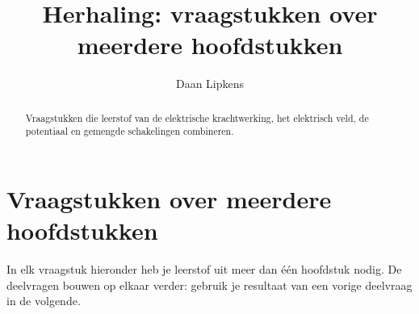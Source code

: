 \documentclass{ximera}
\title{Herhaling: vraagstukken over meerdere hoofdstukken}
\author{Daan Lipkens}
\begin{document}
\begin{abstract}
    Vraagstukken die leerstof van de elektrische krachtwerking, het elektrisch veld, de potentiaal en gemengde schakelingen combineren.
\end{abstract}
\maketitle

\section{Vraagstukken over meerdere hoofdstukken}

In elk vraagstuk hieronder heb je leerstof uit meer dan één hoofdstuk nodig. De deelvragen bouwen op elkaar verder: gebruik je resultaat van een vorige deelvraag in de volgende.
\end{document}
